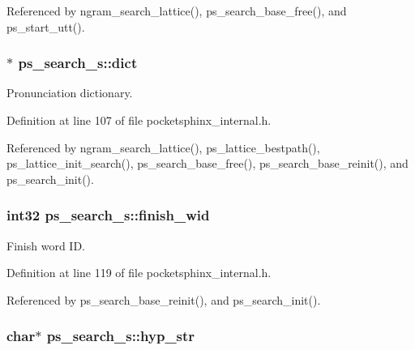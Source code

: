 Referenced by ngram\-\_\-search\-\_\-lattice(), ps\-\_\-search\-\_\-base\-\_\-free(), and ps\-\_\-start\-\_\-utt().

\subsubsection[{dict}]{$\ast$ ps\-\_\-search\-\_\-s\-::dict}\label{structps__search__s_a918f243fa966e72c47f697fb9e60089d}


Pronunciation dictionary. 



Definition at line 107 of file pocketsphinx\-\_\-internal.\-h.



Referenced by ngram\-\_\-search\-\_\-lattice(), ps\-\_\-lattice\-\_\-bestpath(), ps\-\_\-lattice\-\_\-init\-\_\-search(), ps\-\_\-search\-\_\-base\-\_\-free(), ps\-\_\-search\-\_\-base\-\_\-reinit(), and ps\-\_\-search\-\_\-init().

\subsubsection[{finish\-\_\-wid}]{\setlength{\rightskip}{0pt plus 5cm}int32 ps\-\_\-search\-\_\-s\-::finish\-\_\-wid}\label{structps__search__s_a0fb4d79f1084bdbbc0a808513f7c1ca7}


Finish word I\-D. 



Definition at line 119 of file pocketsphinx\-\_\-internal.\-h.



Referenced by ps\-\_\-search\-\_\-base\-\_\-reinit(), and ps\-\_\-search\-\_\-init().

\subsubsection[{hyp\-\_\-str}]{\setlength{\rightskip}{0pt plus 5cm}char$\ast$ ps\-\_\-search\-\_\-s\-::hyp\-\_\-str}\label{structps__search__s_aa398c736a887af97e42b2a562359adc3}


